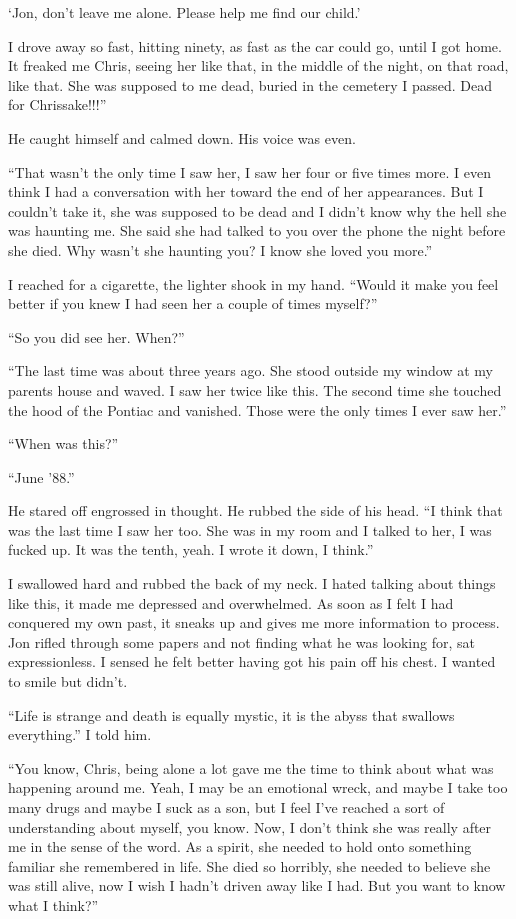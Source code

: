`Jon, don't leave me alone. Please help me find our child.'

I drove away so fast, hitting ninety, as fast as the car could go, until
I got home. It freaked me Chris, seeing her like that, in the middle of
the night, on that road, like that. She was supposed to me dead, buried
in the cemetery I passed. Dead for Chrissake!!!''

He caught himself and calmed down. His voice was even.

``That wasn't the only time I saw her, I saw her four or five times
more. I even think I had a conversation with her toward the end of her
appearances. But I couldn't take it, she was supposed to be dead and I
didn't know why the hell she was haunting me. She said she had talked to
you over the phone the night before she died. Why wasn't she haunting
you? I know she loved you more.''

I reached for a cigarette, the lighter shook in my hand. ``Would it make
you feel better if you knew I had seen her a couple of times myself?''

``So you did see her. When?''

``The last time was about three years ago. She stood outside my window
at my parents house and waved. I saw her twice like this. The second
time she touched the hood of the Pontiac and vanished. Those were the
only times I ever saw her.''

``When was this?''

``June '88.''

He stared off engrossed in thought. He rubbed the side of his head. ``I
think that was the last time I saw her too. She was in my room and I
talked to her, I was fucked up. It was the tenth, yeah. I wrote it down,
I think.''

I swallowed hard and rubbed the back of my neck. I hated talking about
things like this, it made me depressed and overwhelmed. As soon as I
felt I had conquered my own past, it sneaks up and gives me more
information to process. Jon rifled through some papers and not finding
what he was looking for, sat expressionless. I sensed he felt better
having got his pain off his chest. I wanted to smile but didn't.

``Life is strange and death is equally mystic, it is the abyss that
swallows everything.'' I told him.

``You know, Chris, being alone a lot gave me the time to think about
what was happening around me. Yeah, I may be an emotional wreck, and
maybe I take too many drugs and maybe I suck as a son, but I feel I've
reached a sort of understanding about myself, you know. Now, I don't
think she was really after me in the sense of the word. As a spirit, she
needed to hold onto something familiar she remembered in life. She died
so horribly, she needed to believe she was still alive, now I wish I
hadn't driven away like I had. But you want to know what I think?''


